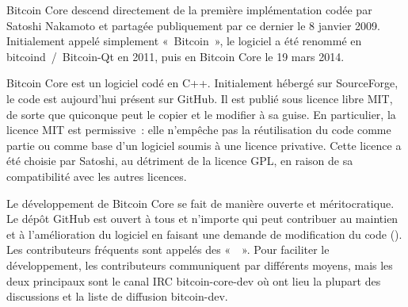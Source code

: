 Bitcoin Core descend directement de la première implémentation codée par Satoshi Nakamoto et partagée publiquement par ce dernier le 8 janvier 2009. Initialement appelé simplement «~Bitcoin~», le logiciel a été renommé en bitcoind~/~Bitcoin-Qt en 2011, puis en Bitcoin Core le 19 mars 2014.

Bitcoin Core est un logiciel codé en C++. Initialement hébergé sur SourceForge, le code est aujourd'hui présent sur GitHub. Il est publié sous licence libre MIT, de sorte que quiconque peut le copier et le modifier à sa guise. En particulier, la licence MIT est permissive~: elle n'empêche pas la réutilisation du code comme partie ou comme base d'un logiciel soumis à une licence privative. Cette licence a été choisie par Satoshi, au détriment de la licence GPL, en raison de sa compatibilité avec les autres licences.

Le développement de Bitcoin Core se fait de manière ouverte et méritocratique. Le dépôt GitHub est ouvert à tous et n'importe qui peut contribuer au maintien et à l'amélioration du logiciel en faisant une demande de modification du code (). Les contributeurs fréquents sont appelés des «~~». Pour faciliter le développement, les contributeurs communiquent par différents moyens, mais les deux principaux sont le canal IRC bitcoin-core-dev où ont lieu la plupart des discussions et la liste de diffusion bitcoin-dev.

